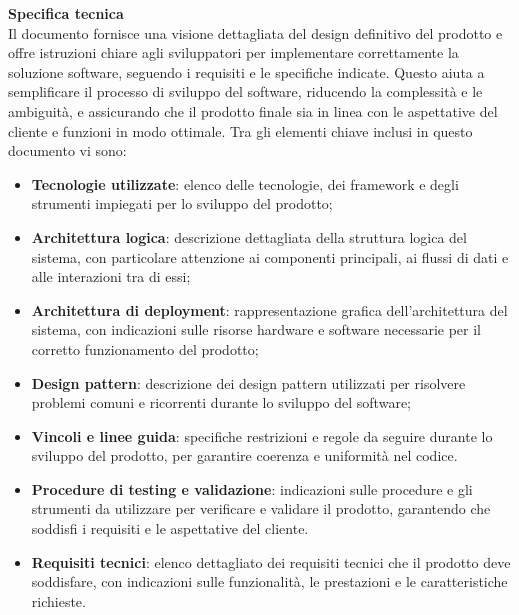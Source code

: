 \textbf{Specifica tecnica}\\ Il documento fornisce una visione dettagliata del design definitivo del prodotto e offre istruzioni chiare agli sviluppatori per implementare correttamente la soluzione software, seguendo i requisiti e le specifiche indicate. Questo aiuta a semplificare il processo di sviluppo del software, riducendo la complessità e le ambiguità, e assicurando che il prodotto finale sia in linea con le aspettative del cliente e funzioni in modo ottimale. Tra gli elementi chiave inclusi in questo documento vi sono:
\begin{itemize}
	\item \textbf{Tecnologie utilizzate}: elenco delle tecnologie, dei framework e degli strumenti impiegati per lo sviluppo del prodotto;
	\item \textbf{Architettura logica}: descrizione dettagliata della struttura logica del sistema, con particolare attenzione ai componenti principali, ai flussi di dati e alle interazioni tra di essi;
	\item \textbf{Architettura di deployment}: rappresentazione grafica dell'architettura del sistema, con indicazioni sulle risorse hardware e software necessarie per il corretto funzionamento del prodotto;
	\item \textbf{Design pattern}: descrizione dei design pattern utilizzati per risolvere problemi comuni e ricorrenti durante lo sviluppo del software;
	\item \textbf{Vincoli e linee guida}: specifiche restrizioni e regole da seguire durante lo sviluppo del prodotto, per garantire coerenza e uniformità nel codice.
	\item \textbf{Procedure di testing e validazione}: indicazioni sulle procedure e gli strumenti da utilizzare per verificare e validare il prodotto, garantendo che soddisfi i requisiti e le aspettative del cliente.
	\item \textbf{Requisiti tecnici}: elenco dettagliato dei requisiti tecnici che il prodotto deve soddisfare, con indicazioni sulle funzionalità, le prestazioni e le caratteristiche richieste.
\end{itemize}

